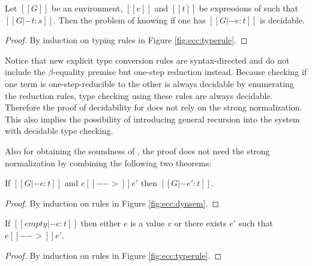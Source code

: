 \begin{thm}
Let $[[G]]$ be an environment, $[[e]]$ and $[[t]]$ be expressions of \expcc such that $[[G |- t : s]]$. Then the problem of knowing if one has $[[G |- e : t]]$ is decidable.
\end{thm}

\begin{proof}
By induction on typing rules in Figure \ref{fig:ecc:typerule}.
\end{proof}

Notice that new explicit type conversion rules are syntax-directed and do not include the $\beta$-equality premise but one-step reduction instead. Because checking if one term is one-step-reducible to the other is always decidable by enumerating the reduction rules, type checking using these rules are always decidable. Therefore the proof of decidability for \expcc does not rely on the strong normalization. This also implies the possibility of introducing general recursion into the system with decidable type checking.

Also for obtaining the soundness of \expcc, the proof does not need the strong normalization by combining the following two theorems:

\begin{thm}
  If $[[G |- e:t]]$ and $e [[-->]] e'$ then $[[G |- e':t]]$.
\end{thm}

\begin{proof}
	By induction on rules in Figure \ref{fig:ecc:dynsem}.
\end{proof}

\begin{thm}[Progress]
  If $[[empty |- e:t]]$ then either $e$ is a value $v$ or there exists
  $e'$ such that $e [[-->]] e'$.
\end{thm}

\begin{proof}
	By induction on rules in Figure \ref{fig:ecc:typerule}.
\end{proof}

